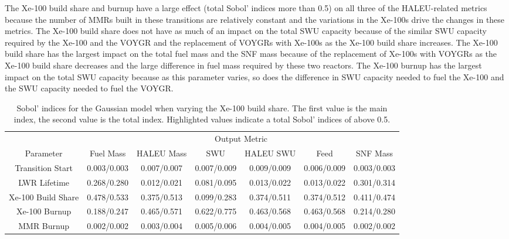 The Xe-100 build share and burnup have a large effect (total Sobol' indices 
more than 0.5) on all three of the \gls{HALEU}-related metrics because the 
number of \glspl{MMR} built in these transitions are relatively constant and the 
variations in the Xe-100s drive the changes in these metrics. The Xe-100 build share 
does not have as much of an impact on the total \gls{SWU} capacity because 
of the similar \gls{SWU} capacity required by the Xe-100 and the VOYGR and 
the replacement of VOYGRs with Xe-100s as the Xe-100 build share increases. 
The Xe-100 build share has the largest impact on the total fuel mass 
and the \gls{SNF} mass because 
of the replacement of Xe-100s with VOYGRs as the Xe-100 build share decreases and 
the large difference in fuel mass required by these two reactors. The Xe-100 
burnup has the largest impact on the total \gls{SWU} capacity because as this 
parameter varies, so does the difference in \gls{SWU} capacity needed to fuel the Xe-100 
and the \gls{SWU} capacity needed to fuel the VOYGR.

\begin{table}[h!]
    \centering
    \caption{Sobol' indices for the Gaussian model when varying the 
    Xe-100 build share. The first value is the 
    main index, the second value is the total index. Highlighted 
    values indicate a total Sobol' indices of above 0.5.}
    \label{tab:s7_sobol_xe100_gaussian}
    \begin{tabular}{c c c c c c c}
        \hline
        & \multicolumn{6}{c}{Output Metric} \\
        Parameter & Fuel Mass & HALEU Mass & SWU & HALEU SWU & Feed & SNF Mass \\
        \hline
        Transition Start & 0.003/0.003 & 0.007/0.007 & 0.007/0.009 &
                           0.009/0.009 & 0.006/0.009 & 0.003/0.003\\
        LWR Lifetime & 0.268/0.280 & 0.012/0.021 & 0.081/0.095 &
                       0.013/0.022 & 0.013/0.022 & 0.301/0.314\\
        Xe-100 Build Share & \cellcolor{green!25}0.478/0.533 & \cellcolor{green!25}0.375/0.513 & 0.099/0.283 &
        \cellcolor{green!25}0.374/0.511 & \cellcolor{green!25}0.374/0.512 & 0.411/0.474\\
        Xe-100 Burnup & 0.188/0.247 & \cellcolor{green!25}0.465/0.571 & \cellcolor{green!25}0.622/0.775 & 
        \cellcolor{green!25}0.463/0.568 & \cellcolor{green!25}0.463/0.568 & 0.214/0.280\\
        MMR Burnup & 0.002/0.002 & 0.003/0.004 & 0.005/0.006 & 
                     0.004/0.005 & 0.004/0.005 & 0.002/0.002\\
        \hline        
    \end{tabular}
\end{table}

